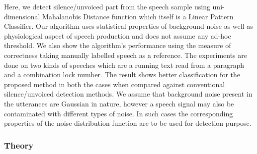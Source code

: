 \documentclass[12pt, a4paper, twoside]{report}
\begin{document}
Here, we detect silence/unvoiced part from the speech sample using uni-dimensional Mahalanobis Distance  function which itself is a Linear Pattern Classifier. Our algorithm uses statistical properties of background noise as well as physiological aspect of speech production and does not assume any ad-hoc threshold. We also show the algorithm's performance using the measure of correctness taking manually labelled speech as a reference. The experiments are done on two kinds of speeches which are a running text read from a paragraph and a combination lock number. The result shows better classification for the proposed method in both the cases when compared against conventional silence/unvoiced detection methods. We assume that background noise present in the utterances are Gaussian in nature, however a speech signal may also be contaminated with different types of noise. In such cases the corresponding properties of the noise distribution function are to be used for detection purpose.


\subsubsection{Theory}
\end{document}
